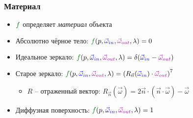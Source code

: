\documentclass{beamer}
\begin{document}
\begin{frame}[fragile]
\begin{center}
\end{center}
\end{frame}

\begin{frame}[fragile]
\frametitle{Материал}
\begin{itemize}
\item \begin{math}{\color{green}f}\end{math} определяет \textit{материал} объекта
\pause 
\item Абсолютно чёрное тело: \begin{math}{\color{green}f}(p, {\color{blue}\vec\omega_{in}}, {\color{magenta}\vec\omega_{out}}, \lambda) = 0\end{math}
\pause
\item Идеальное зеркало: \begin{math}{\color{green}f}(p, {\color{blue}\vec\omega_{in}}, {\color{magenta}\vec\omega_{out}}, \lambda) = \delta({\color{blue}\vec\omega_{in}} - {\color{magenta}\vec\omega_{out}})\end{math}
\pause
\item Старое зеркало: \begin{math}{\color{green}f}(p, {\color{blue}\vec\omega_{in}}, {\color{magenta}\vec\omega_{out}}, \lambda) = \left(R_{\vec n}({\color{blue}\vec\omega_{in}})\cdot{\color{magenta}\vec\omega_{out}}\right)^7\end{math}
\begin{itemize}
\item \begin{math}R\end{math} -- отраженный вектор: \begin{math}R_{\vec n}(\vec \omega) = 2\vec n \cdot (\vec n \cdot \vec \omega) - \vec \omega\end{math}
\end{itemize}
\pause
\item Диффузная поверхность: \begin{math}{\color{green}f}(p, {\color{blue}\vec\omega_{in}}, {\color{magenta}\vec\omega_{out}}, \lambda) = 1\end{math}
\end{itemize}
\end{frame}
\end{document}
